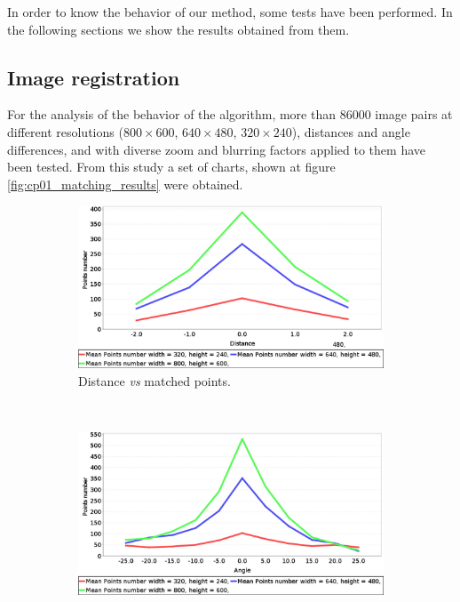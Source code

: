 In order to know the behavior of our method, some tests have been performed. In the following sections we show the results obtained from them.

\subsection{Image registration}\label{ch:chapter01_02_01}

For the analysis of the behavior of the algorithm, more than 86000 image pairs at different resolutions ($800 \times 600$, $640 \times 480$, $320 \times 240$), distances and angle differences, and with diverse zoom and blurring factors applied to them have been tested. From this study a set of charts, shown at figure \ref{fig:cp01_matching_results} were obtained.

\begin{figure}[h!]
        \centering
        \begin{subfigure}[b]{0.45\textwidth}
	    \includegraphics[width=\textwidth]{distVsMatches}
	  \caption{Distance \emph{vs} matched points.}\label{fig:cp01_distance_vs_matched}
        \end{subfigure}%
        ~
        \begin{subfigure}[b]{0.45\textwidth}
	    \includegraphics[width=\textwidth]{angleVsMatches}

\end{subfigure}
\end{figure}
